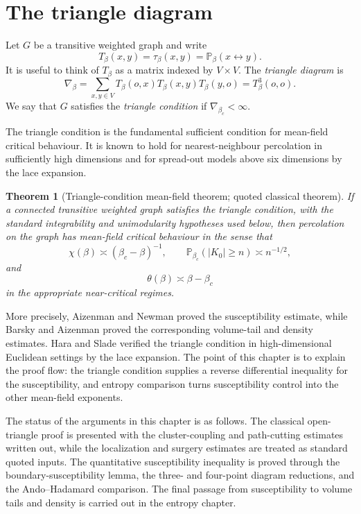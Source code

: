 \documentclass[11pt,reqno]{book}
\numberwithin{equation}{chapter}
\theoremstyle{plain}
\newtheorem{theorem}{Theorem}[chapter]
\theoremstyle{definition}
\theoremstyle{remark}
\newcommand{\Pb}{\mathbb P_\beta}
\renewcommand{\P}{\mathbb P}
\newcommand{\1}{\mathbf 1}
\newcommand{\as}{\asymp}
\begin{document}
\section{The triangle diagram}

Let $G$ be a transitive weighted graph and write
\[
  T_\beta(x,y)=\tau_\beta(x,y)=\Pb(x\leftrightarrow y).
\]
It is useful to think of $T_\beta$ as a matrix indexed by $V\times V$. The \emph{triangle diagram} is
\[
  \nabla_\beta
  =
  \sum_{x,y\in V}T_\beta(o,x)T_\beta(x,y)T_\beta(y,o)
  =
  T_\beta^3(o,o).
\]
We say that $G$ satisfies the \emph{triangle condition} if $\nabla_{\beta_c}<\infty$.

The triangle condition is the fundamental sufficient condition for mean-field critical behaviour. It is known to hold for nearest-neighbour percolation in sufficiently high dimensions and for spread-out models above six dimensions by the lace expansion.

\begin{theorem}[Triangle-condition mean-field theorem; quoted classical theorem]
If a connected transitive weighted graph satisfies the triangle condition, with the standard integrability and unimodularity hypotheses used below, then percolation on the graph has mean-field critical behaviour in the sense that
\[
  \chi(\beta)\as (\beta_c-\beta)^{-1},\qquad
  \P_{\beta_c}(|K_0|\geq n)\as n^{-1/2},
\]
and
\[
  \theta(\beta)\as \beta-\beta_c
\]
in the appropriate near-critical regimes.
\end{theorem}

More precisely, Aizenman and Newman proved the susceptibility estimate, while Barsky and Aizenman proved the corresponding volume-tail and density estimates. Hara and Slade verified the triangle condition in high-dimensional Euclidean settings by the lace expansion. The point of this chapter is to explain the proof flow: the triangle condition supplies a reverse differential inequality for the susceptibility, and entropy comparison turns susceptibility control into the other mean-field exponents.

The status of the arguments in this chapter is as follows. The classical open-triangle proof is presented with the cluster-coupling and path-cutting estimates written out, while the localization and surgery estimates are treated as standard quoted inputs. The quantitative susceptibility inequality is proved through the boundary-susceptibility lemma, the three- and four-point diagram reductions, and the Ando--Hadamard comparison. The final passage from susceptibility to volume tails and density is carried out in the entropy chapter.
\end{document}
